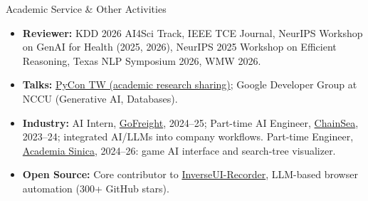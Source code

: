 \documentclass{resume} %
\begin{document}
\begin{rSection}{Academic Service \& Other Activities}
\setlength{\leftmarginii}{1em}
\begin{itemize} \itemsep -3pt
  \item \textbf{Reviewer:} KDD 2026 AI4Sci Track, IEEE TCE Journal, NeurIPS Workshop on GenAI for Health (2025, 2026), NeurIPS 2025 Workshop on Efficient Reasoning, Texas NLP Symposium 2026, WMW 2026.
  \item \textbf{Talks:} \href{https://tw.pycon.org/2026/zh-hant/conference/young-inspires}{PyCon TW (academic research sharing)}; Google Developer Group at NCCU (Generative AI, Databases).
  \item \textbf{Industry:} AI Intern, \href{https://www.gofreight.com/}{GoFreight}, 2024--25; Part-time AI Engineer, \href{https://www.chainsea.com.tw/about/introduction/}{ChainSea}, 2023--24; integrated AI/LLMs into company workflows. Part-time Engineer, \href{https://tirongwu-5d.github.io/}{Academia Sinica}, 2024--26: game AI interface and search-tree visualizer.
  \item \textbf{Open Source:} Core contributor to \href{https://github.com/InverseUI/InverseUI-Recorder}{InverseUI-Recorder}, LLM-based browser automation (300+ GitHub stars).
\end{itemize}

\end{rSection}


\end{document}
